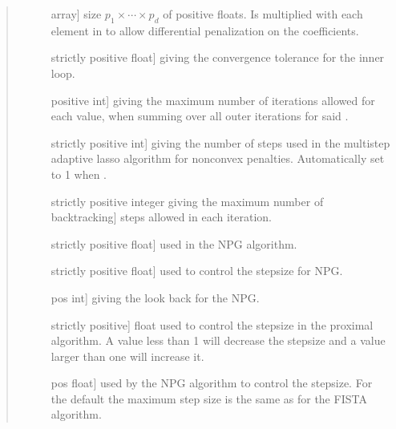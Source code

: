 \documentclass[letterpaper,10pt,english]{sphinxmanual}
\begin{document}
\begin{fulllineitems}
\begin{quote}
\begin{description}
\begin{description}
\item[{}] \leavevmode{[}array{]}
\sphinxAtStartPar
size \(p_1 \times \cdots \times p_d\) of positive floats. 
Is multiplied with each element in    to allow
differential penalization on the coefficients.

\item[{}] \leavevmode{[}strictly positive float{]}
\sphinxAtStartPar
giving the convergence tolerance for the inner loop.

\item[{}] \leavevmode{[}positive int{]}
\sphinxAtStartPar
giving the maximum number of  iterations
allowed for each    value, when  summing over all outer iterations
for said   .

\item[{}] \leavevmode{[}strictly positive int{]}
\sphinxAtStartPar
giving the number of steps used in the
multi\sphinxhyphen{}step adaptive lasso algorithm for non\sphinxhyphen{}convex penalties. Automatically
set to 1 when   .

\item[{}] \leavevmode{[}strictly positive integer giving the maximum number of backtracking{]}
\sphinxAtStartPar
steps allowed in each iteration.

\item[{}] \leavevmode{[}strictly positive float{]}
\sphinxAtStartPar
used in the NPG algorithm.

\item[{}] \leavevmode{[}strictly positive float{]}
\sphinxAtStartPar
used to control the stepsize for NPG.

\item[{}] \leavevmode{[}pos int{]}
\sphinxAtStartPar
giving the look back for the NPG.

\item[{}] \leavevmode{[}strictly positive{]}
\sphinxAtStartPar
float used to control the stepsize in the proximal algorithm. A  value less than 1 will decrease 
the stepsize and a value larger than one will increase it.

\item[{}] \leavevmode{[}pos float{]}
\sphinxAtStartPar
used by the NPG algorithm to control the
stepsize. For the default   the maximum step size is the same
as for the FISTA algorithm.


\end{description}
\end{description}
\end{quote}
\end{fulllineitems}
\end{document}
